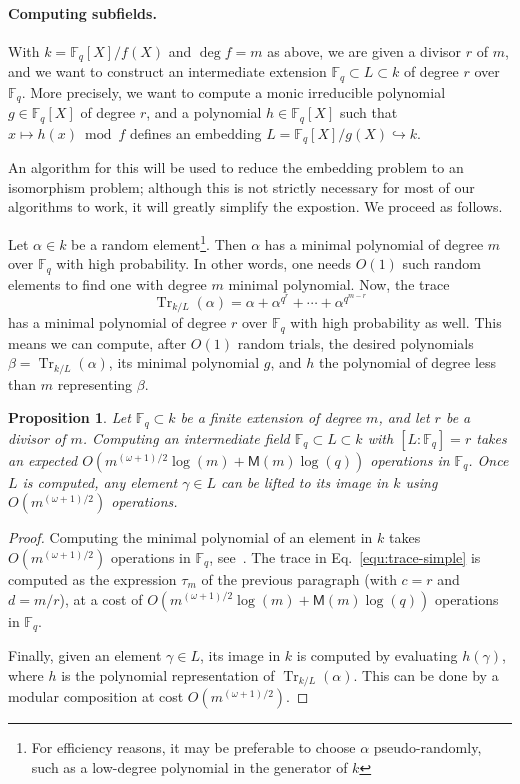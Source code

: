\documentclass{mcom-l}
\theoremstyle{plain}
\newtheorem{proposition}[theorem]{Proposition}
\theoremstyle{definition}
\DeclareMathOperator{\trace}{Tr} %
\newcommand{\F}{\ensuremath{\mathbb{F}}}
\newcommand{\MM}{\ensuremath{\mathsf{M}}}
\newcounter{algorithm}
\begin{document}
\paragraph{\bf Computing subfields.}
With $k = \F_q[X]/f(X)$ and $\deg f=m$ as above, we are given a
divisor $r$ of $m$, and we want to construct an intermediate extension
$\F_q \subset L \subset k$ of degree $r$ over $\F_q$. More precisely,
we want to compute a monic irreducible polynomial $g \in \F_q[X]$ of
degree $r$, and a polynomial $h \in \F_q[X]$ such that
$x \mapsto h(x)\bmod f$ defines an embedding
$L = \F_q[X] / g(X) \hookrightarrow k$.

An algorithm for this will be used to reduce the embedding problem to
an isomorphism problem; although this is not strictly necessary for
most of our algorithms to work, it will greatly simplify the
expostion. We proceed as follows.

Let $\alpha\in k$ be a random element\footnote{For efficiency reasons,
  it may be preferable to choose $\alpha$ pseudo-randomly, such as a
  low-degree polynomial in the generator of $k$}. %
Then $\alpha$ has a minimal polynomial of degree $m$ 
over $\F_q$ with high probability. In other words, one needs $O(1)$ such random elements to find 
one with degree $m$ minimal polynomial. Now, the trace
\begin{equation}
	\label{equ:trace-simple}
	\trace_{k/L}(\alpha) = \alpha + \alpha^{q^r} + \cdots + \alpha^{q^{m - r}}
\end{equation}
has a minimal polynomial of degree $r$ over $\F_q$ with high
probability as well. This means we can compute, after $O(1)$ random
trials, the desired polynomials $\beta = \trace_{k/L}(\alpha)$,
its minimal polynomial
$g$, and $h$ the polynomial of degree less than $m$ representing $\beta$.

\begin{proposition}
	\label{prop:subfield}
	Let $\F_q \subset k$ be a finite extension of degree $m$, and
        let $r$ be a divisor of $m$.  Computing an intermediate field
        $\F_q \subset L \subset k$ with $[L:\F_q]=r$ takes an expected
        $O(m^{(\omega+1)/2}\log(m) + \MM(m)\log(q))$ operations in $\F_q$.  Once
        $L$ is computed, any element $\gamma\in L$ can be lifted to
        its image in $k$ using $O(m^{(\omega+1)/2})$ operations.
\end{proposition}
\begin{proof}
  Computing the minimal polynomial of an element in $k$ takes
  $O(m^{(\omega+1)/2})$ operations in $\F_q$, see~\cite{shoup99}. %
  The trace in Eq.~\eqref{equ:trace-simple} is computed as the
  expression $\tau_m$ of the previous paragraph (with $c=r$ and
  $d=m/r$), at a cost of $O(m^{(\omega+1)/2}\log(m)+\MM(m)\log(q))$
  operations in $\F_q$.
  
  Finally, given an element $\gamma\in L$, its image in $k$ is
  computed by evaluating $h(\gamma)$, where $h$ is the polynomial
  representation of $\trace_{k/L}(\alpha)$. This can be done by a
  modular composition at cost $O(m^{(\omega+1)/2})$.
\end{proof}
\end{document}
